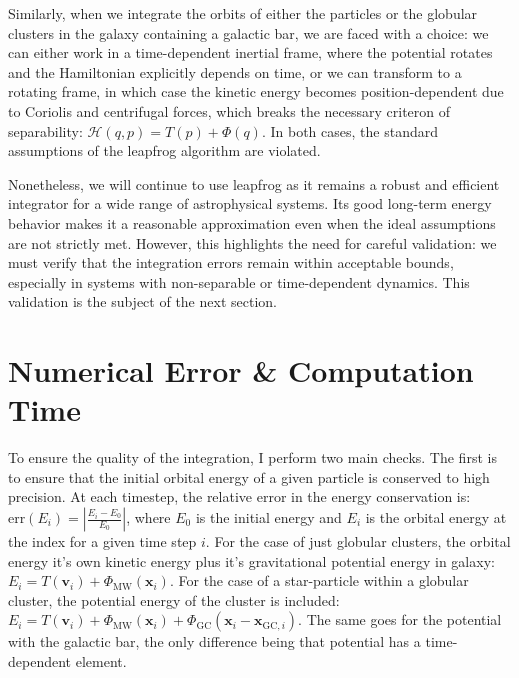     Similarly, when we integrate the orbits of either the particles or the globular clusters in the galaxy containing a galactic bar, we are faced with a choice: we can either work in a time-dependent inertial frame, where the potential rotates and the Hamiltonian explicitly depends on time, or we can transform to a rotating frame, in which case the kinetic energy becomes position-dependent due to Coriolis and centrifugal forces, which breaks the necessary criteron of separability: $\mathcal{H}(q,p) = T(p)+\Phi(q)$. In both cases, the standard assumptions of the leapfrog algorithm are violated.

    Nonetheless, we will continue to use leapfrog as it remains a robust and efficient integrator for a wide range of astrophysical systems. Its good long-term energy behavior makes it a reasonable approximation even when the ideal assumptions are not strictly met. However, this highlights the need for careful validation: we must verify that the integration errors remain within acceptable bounds, especially in systems with non-separable or time-dependent dynamics. This validation is the subject of the next section.


\section{Numerical Error \& Computation Time}

    To ensure the quality of the integration, I perform two main checks. The first is to ensure that the initial orbital energy of a given particle is conserved to high precision. At each timestep, the relative error in the energy conservation is: $
    \mathrm{err}(E_i) = \left|\frac{E_i - E_0}{E_0}\right|$, where $E_0$ is the initial energy and $E_i$ is the orbital energy at the index for a given time step $i$. For the case of just globular clusters, the orbital energy it's own kinetic energy plus it's gravitational potential energy in galaxy: $E_i = T(\textbf{v}_i) + \Phi_{\mathrm{MW}}\left(\textbf{x}_i\right)$. For the case of a star-particle within a globular cluster, the potential energy of the cluster is included: $E_i = T(\textbf{v}_i) + \Phi_{\mathrm{MW}}\left(\textbf{x}_i\right) + \Phi_\mathrm{GC}\left(\textbf{x}_i - \textbf{x}_{\mathrm{GC},i}\right)$. The same goes for the potential with the galactic bar, the only difference being that potential has a time-dependent element. 

